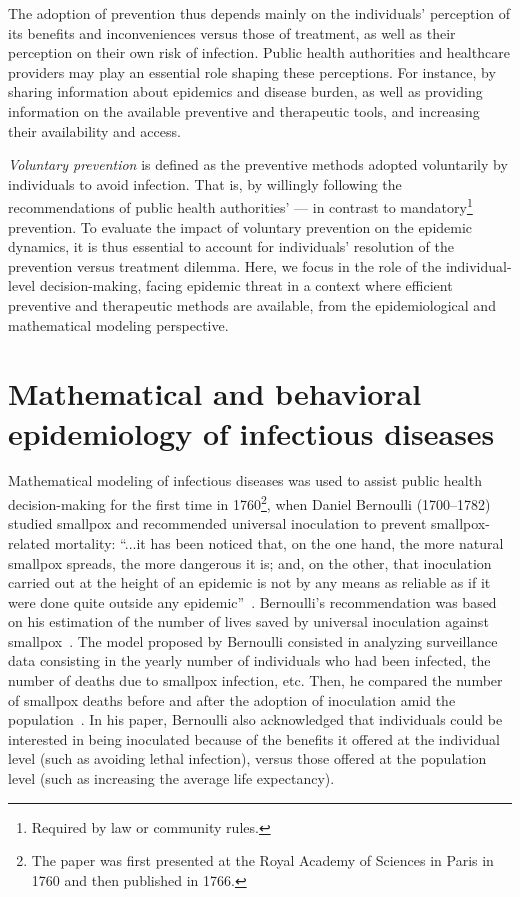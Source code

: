 The adoption of prevention thus depends mainly on the individuals' perception of its benefits and inconveniences versus those of treatment, as well as their perception on their own risk of infection. Public health authorities and healthcare providers may play an essential role shaping these perceptions. For instance, by sharing information about epidemics and disease burden, as well as providing information on the available preventive and therapeutic tools, and increasing their availability and access.%

\textit{Voluntary prevention} is defined as the preventive methods adopted voluntarily by individuals to avoid infection. That is, by willingly following the recommendations of public health authorities' --- in contrast to mandatory\footnote{Required by law or community rules.} prevention. To evaluate the impact of voluntary prevention on the epidemic dynamics, it is thus essential to account for individuals' resolution of the prevention versus treatment dilemma. %
%
Here, we focus in the role of the individual-level decision-making, facing epidemic threat in a context where efficient preventive and therapeutic methods are available, from the epidemiological and mathematical modeling perspective.

\section{Mathematical and behavioral epidemiology of infectious diseases}
\label{Intro:BehavEpi} 

Mathematical modeling of infectious diseases was used to assist public health decision-making for the first time in 1760\footnote{The paper was first presented at the Royal Academy of Sciences in Paris in 1760 and then published in 1766.}, when Daniel Bernoulli (1700--1782) studied smallpox and recommended universal inoculation to prevent smallpox-related mortality: ``...it has been noticed that, on the one hand, the more natural smallpox spreads, the more dangerous it is; and, on the other, that inoculation carried out at the height of an epidemic is not by any means as reliable as if it were done quite outside any epidemic''~\cite[]{Bernoulli1766,Blower2004}. Bernoulli's recommendation was based on his estimation of the number of lives saved by universal inoculation against smallpox~\cite[]{Blower2004}. The model proposed by Bernoulli consisted in analyzing surveillance data consisting in the yearly number of individuals who had been infected, the number of deaths due to smallpox infection, etc. Then, he compared the number of smallpox deaths before and after the adoption of inoculation amid the population~\cite[]{Blower2004,Dietz2002}. In his paper, Bernoulli also acknowledged that individuals could be interested in being inoculated because of the benefits it offered at the individual level (such as avoiding lethal infection), versus those offered at the population level (such as increasing the average life expectancy).

